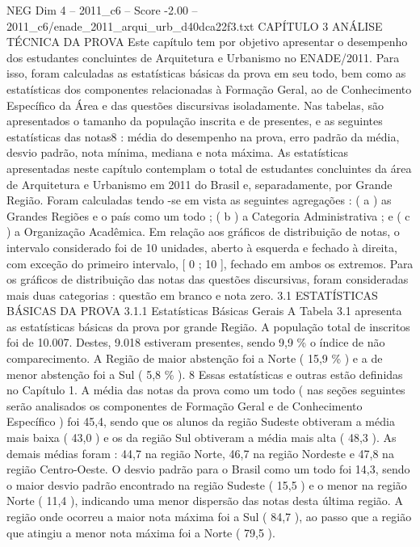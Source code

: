 \begin{textsample}{NEG Dim 4 – 2011\_c6 – Score -2.00 – 2011\_c6/enade\_2011\_arqui\_urb\_d40dca22f3.txt}  \label{ex:f4_neg_057}
CAPÍTULO 3 ANÁLISE TÉCNICA DA PROVA Este capítulo tem por objetivo apresentar o desempenho dos estudantes concluintes de Arquitetura e Urbanismo no ENADE/2011.
Para isso, foram calculadas as estatísticas básicas da prova em seu todo, bem como as estatísticas dos componentes relacionadas à Formação Geral, ao de Conhecimento Específico da Área e das questões discursivas isoladamente.
Nas tabelas, são apresentados o tamanho da população inscrita e de presentes, e as seguintes estatísticas das notas8 : média do desempenho na prova, erro padrão da média, desvio padrão, nota mínima, mediana e nota máxima.
As estatísticas apresentadas neste capítulo contemplam o total de estudantes concluintes da área de Arquitetura e Urbanismo em 2011 do Brasil e, separadamente, por Grande Região.
Foram calculadas tendo -se em vista as seguintes agregações : ( a ) as Grandes Regiões e o país como um todo ; ( b ) a Categoria Administrativa ; e ( c ) a Organização Acadêmica.
Em relação aos gráficos de distribuição de notas, o intervalo considerado foi de 10 unidades, aberto à esquerda e fechado à direita, com exceção do primeiro intervalo, [ 0 ; 10 ], fechado em ambos os extremos.
Para os gráficos de distribuição das notas das questões discursivas, foram consideradas mais duas categorias : questão em branco e nota zero. 3.1 ESTATÍSTICAS BÁSICAS DA PROVA 3.1.1 Estatísticas Básicas Gerais A Tabela 3.1 apresenta as estatísticas básicas da prova por grande Região.
A população total de inscritos foi de 10.007.
Destes, 9.018 estiveram presentes, sendo 9,9 \% o índice de não comparecimento.
A Região de maior abstenção foi a Norte ( 15,9 \% ) e a de menor abstenção foi a Sul ( 5,8 \% ). 8 Essas estatísticas e outras estão definidas no Capítulo 1.
A média das notas da prova como um todo ( nas seções seguintes serão analisados os componentes de Formação Geral e de Conhecimento Específico ) foi 45,4, sendo que os alunos da região Sudeste obtiveram a média mais baixa ( 43,0 ) e os da região Sul obtiveram a média mais alta ( 48,3 ).
As demais médias foram : 44,7 na região Norte, 46,7 na região Nordeste e 47,8 na região Centro-Oeste.
O desvio padrão para o Brasil como um todo foi 14,3, sendo o maior desvio padrão encontrado na região Sudeste ( 15,5 ) e o menor na região Norte ( 11,4 ), indicando uma menor dispersão das notas desta última região.
A região onde ocorreu a maior nota máxima foi a Sul ( 84,7 ), ao passo que a região que atingiu a menor nota máxima foi a Norte ( 79,5 ).

\end{textsample}
